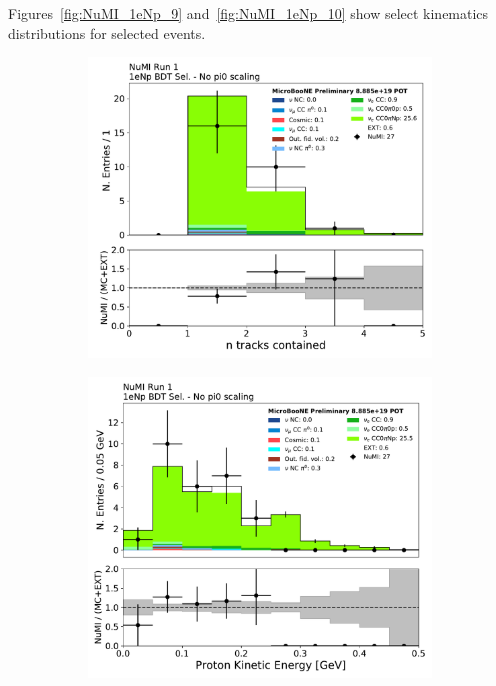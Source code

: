 Figures~\ref{fig:NuMI_1eNp_9} and~\ref{fig:NuMI_1eNp_10} show select kinematics distributions for selected \npsel events.

\begin{figure}[H]
    \centering
    \begin{subfigure}{0.3\textwidth}
    \includegraphics[width=1.0\textwidth]{Sidebands/Figures/NuMI/1eNp/BDTSel/n_tracks_contained.pdf}
    \caption{}
    \end{subfigure}
    \begin{subfigure}{0.3\textwidth}
    \includegraphics[width=1.0\textwidth]{Sidebands/Figures/NuMI/1eNp/BDTSel/protonenergy.pdf}

\end{subfigure}
\end{figure}

